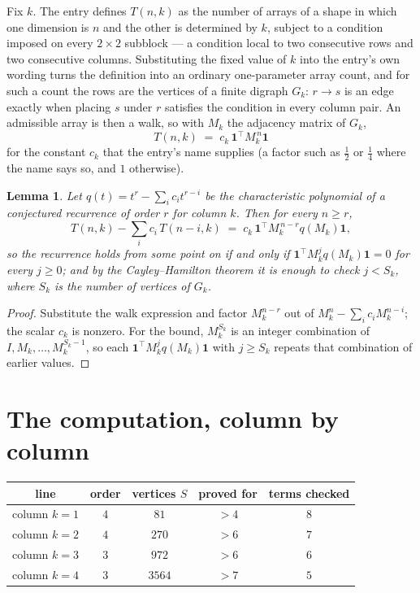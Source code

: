 \documentclass[11pt,a4paper]{article}
\theoremstyle{plain}
\newtheorem{lemma}[theorem]{Lemma}
\theoremstyle{definition}
\begin{document}
Fix $k$. The entry defines $T(n,k)$ as the number of arrays of a shape in which one dimension
is $n$ and the other is determined by $k$, subject to a condition imposed on every
$2\times2$ subblock --- a condition local to two consecutive rows and two consecutive columns.
Substituting the fixed value of $k$ into the entry's own wording turns the definition into an
ordinary one-parameter array count, and for such a count the rows are the vertices of a finite
digraph $G_k$: $r\to s$ is an edge exactly when placing $s$ under $r$ satisfies the condition
in every column pair. An admissible array is then a walk, so with $M_k$ the adjacency matrix
of $G_k$,
\[
T(n,k)\;=\;c_k\,\mathbf{1}^{\!\top}M_k^{\,n}\mathbf{1}
\]
for the constant $c_k$ that the entry's name supplies (a factor such as $\tfrac12$ or
$\tfrac14$ where the name says so, and $1$ otherwise).

\begin{lemma}\label{lem:crit}
Let $q(t)=t^{r}-\sum_i c_it^{r-i}$ be the characteristic polynomial of a conjectured
recurrence of order $r$ for column $k$. Then for every $n\ge r$,
\[
T(n,k)-\sum_i c_i\,T(n-i,k)\;=\;c_k\,\mathbf{1}^{\!\top}M_k^{\,n-r}q(M_k)\mathbf{1},
\]
so the recurrence holds from some point on if and only if
$\mathbf{1}^{\!\top}M_k^{j}q(M_k)\mathbf{1}=0$ for every $j\ge0$; and by the
Cayley--Hamilton theorem it is enough to check $j<S_k$, where $S_k$ is the number of vertices
of $G_k$.
\end{lemma}

\begin{proof}
Substitute the walk expression and factor $M_k^{n-r}$ out of $M_k^{n}-\sum_ic_iM_k^{n-i}$;
the scalar $c_k$ is nonzero. For the bound, $M_k^{S_k}$ is an integer combination of
$I,M_k,\dots,M_k^{S_k-1}$, so each $\mathbf{1}^{\!\top}M_k^{j}q(M_k)\mathbf{1}$ with
$j\ge S_k$ repeats that combination of earlier values.
\end{proof}

\section{The computation, column by column}

\begin{center}
\begin{tabular}{ccccc}
line & order & vertices $S$ & proved for & terms checked \\ \hline
column $k$$=1$ & $4$ & $81$ & $>4$ & $8$ \\
column $k$$=2$ & $4$ & $270$ & $>6$ & $7$ \\
column $k$$=3$ & $3$ & $972$ & $>6$ & $6$ \\
column $k$$=4$ & $3$ & $3564$ & $>7$ & $5$ \\
\end{tabular}
\end{center}
\end{document}
